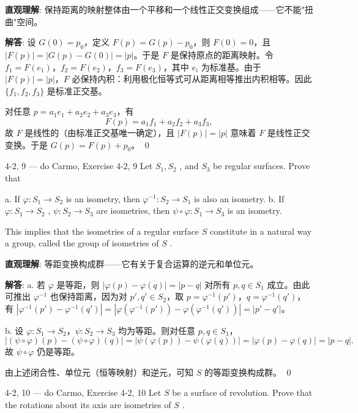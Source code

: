 \begin{solution}
\textbf{直观理解}: 保持距离的映射整体由一个平移和一个线性正交变换组成——它不能"扭曲"空间。

\textbf{解答}: 设 $G(0)=p_0$，定义 $F(p) = G(p)-p_0$，则 $F(0)=0$，且 $|F(p)| = |G(p)-G(0)| = |p|$。于是 $F$ 是保持原点的距离映射。令 $f_1=F(e_1)$，$f_2=F(e_2)$，$f_3=F(e_3)$，其中 $e_i$ 为标准基。由于 $|F(p)|=|p|$，$F$ 必保持内积：利用极化恒等式可从距离相等推出内积相等。因此 $\{f_1,f_2,f_3\}$ 是标准正交基。

对任意 $p = a_1e_1+a_2e_2+a_3e_3$，有
\[
F(p) = a_1f_1+a_2f_2+a_3f_3,
\]
故 $F$ 是线性的（由标准正交基唯一确定），且 $|F(p)|=|p|$ 意味着 $F$ 是线性正交变换。于是 $G(p) = F(p)+p_0$。
\qed
\end{solution}

\begin{exercise}{4-2, 9 — do Carmo, Exercise 4-2, 9}
Let $S_{1}, S_{2}$ , and $S_{3}$ be regular surfaces. Prove that

a. If $\varphi \colon S_1\to S_2$ is an isometry, then $\varphi^{-1}\colon S_2\to S_1$ is also an isometry.
b. If $\varphi \colon S_1 \to S_2$ , $\psi \colon S_2 \to S_3$ are isometries, then $\psi \circ \varphi \colon S_1 \to S_3$ is an isometry.

This implies that the isometries of a regular surface $S$ constitute in a natural way a group, called the group of isometries of $S$ .
\end{exercise}

\begin{solution}
\textbf{直观理解}: 等距变换构成群——它有关于复合运算的逆元和单位元。

\textbf{解答}: a. 若 $\varphi$ 是等距，则 $|\varphi(p)-\varphi(q)| = |p-q|$ 对所有 $p,q\in S_1$ 成立。由此可推出 $\varphi^{-1}$ 也保持距离，因为对 $p',q'\in S_2$，取 $p=\varphi^{-1}(p')$，$q=\varphi^{-1}(q')$，有 $|\varphi^{-1}(p')-\varphi^{-1}(q')| = |\varphi(\varphi^{-1}(p'))-\varphi(\varphi^{-1}(q'))| = |p'-q'|$。

b. 设 $\varphi: S_1\to S_2$，$\psi: S_2\to S_3$ 均为等距。则对任意 $p,q\in S_1$，
\[
|(\psi\circ\varphi)(p)-(\psi\circ\varphi)(q)| = |\psi(\varphi(p))-\psi(\varphi(q))| = |\varphi(p)-\varphi(q)| = |p-q|.
\]
故 $\psi\circ\varphi$ 仍是等距。

由上述闭合性、单位元（恒等映射）和逆元，可知 $S$ 的等距变换构成群。
\qed
\end{solution}

\begin{exercise}{4-2, 10 — do Carmo, Exercise 4-2, 10}
Let $S$ be a surface of revolution. Prove that the rotations about its axis are isometries of $S$ .
\end{exercise}

